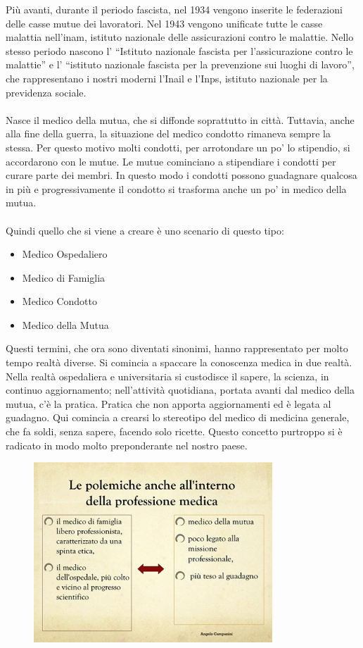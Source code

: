 Più avanti, durante il periodo fascista, nel 1934 vengono inserite le
federazioni delle casse mutue dei lavoratori. Nel 1943 vengono unificate
tutte le casse malattia nell'inam, istituto nazionale delle
assicurazioni contro le malattie. Nello stesso periodo nascono l'
``Istituto nazionale fascista per l'assicurazione contro le malattie'' e
l' ``istituto nazionale fascista per la prevenzione sui luoghi di
lavoro'', che rappresentano i nostri moderni l'Inail e l'Inps, istituto
nazionale per la previdenza sociale.
\\\\
Nasce il medico della mutua, che si diffonde soprattutto in città.
Tuttavia, anche alla fine della guerra, la situazione del medico
condotto rimaneva sempre la stessa. Per questo motivo molti condotti,
per arrotondare un po' lo stipendio, si accordarono con le mutue. Le
mutue cominciano a stipendiare i condotti per curare parte dei membri.
In questo modo i condotti possono guadagnare qualcosa in più e
progressivamente il condotto si trasforma anche un po' in medico della
mutua.
\\\\
Quindi quello che si viene a creare è uno scenario di questo tipo:

\begin{itemize}
\item
  Medico Ospedaliero
\item
  Medico di Famiglia
\item
  Medico Condotto
\item
  Medico della Mutua
\end{itemize}

Questi termini, che ora sono diventati sinonimi, hanno rappresentato per
molto tempo realtà diverse. Si comincia a spaccare la conoscenza medica
in due realtà. Nella realtà ospedaliera e universitaria si custodisce il
sapere, la scienza, in continuo aggiornamento; nell'attività quotidiana,
portata avanti dal medico della mutua, c'è la pratica. Pratica che non
apporta aggiornamenti ed è legata al guadagno. Qui comincia a crearsi lo
stereotipo del medico di medicina generale, che fa soldi, senza sapere,
facendo solo ricette. Questo concetto purtroppo si è radicato in modo
molto preponderante nel nostro paese.

\begin{figure}[!ht]
\centering
	\includegraphics[width=0.8\textwidth]{38/image5.jpg}
	\end{figure}
	
